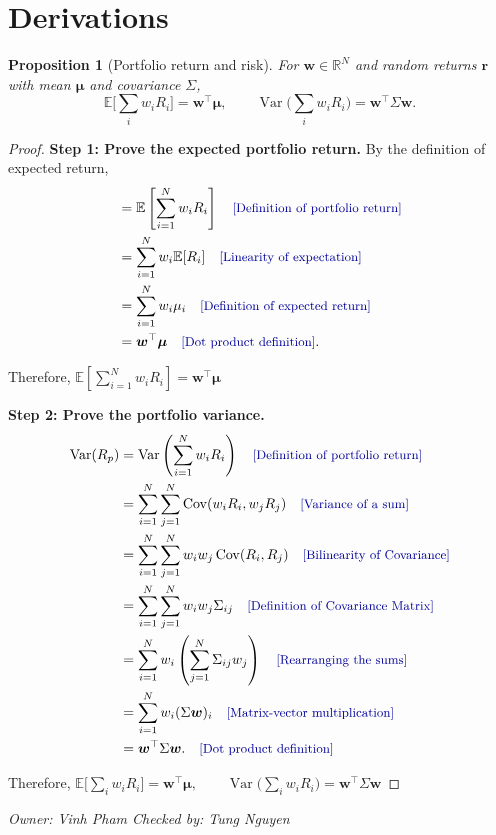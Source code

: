\documentclass[11pt]{article}
\theoremstyle{plain}
\newtheorem{proposition}[theorem]{Proposition}
\theoremstyle{definition}
\newcommand{\R}{\mathbb{R}}
\newcommand{\E}{\mathbb{E}}
\newcommand{\Var}{\operatorname{Var}}
\newcommand{\w}{\bm{w}}
\newcommand{\bmu}{\bm{\mu}}
\newcommand{\by}[1]{\quad\text{\small\color{blue!60!black}[#1]}}   %
\newcommand{\owner}[2]{\par\smallskip\noindent\textit{Owner: #1 \quad Checked by: #2}\par}
\begin{document}
\section{Derivations}

\begin{proposition}[Portfolio return and risk]\label{prop:q1}
For $\w\in\R^N$ and random returns $\bm r$ with mean $\bmu$ and covariance $\Sigma$,
\[
\E\Big[\textstyle\sum_i w_iR_i\Big] = \w^\top\bmu, \qquad
\Var\Big(\textstyle\sum_i w_iR_i\Big) = \w^\top\Sigma\w .
\]
\end{proposition}
\begin{proof}

\textbf{Step 1: Prove the expected portfolio return.}
By the definition of expected return,
\begin{align*}
&=\E\left[\sum_{i=1}^{N}w_iR_i\right]
\by{Definition of portfolio return}\\
&=\sum_{i=1}^{N}w_i\E[R_i]
\by{Linearity of expectation}\\
&=\sum_{i=1}^{N}w_i\mu_i
\by{Definition of expected return}\\
&=\w^\top\bmu
\by{Dot product definition}.
\end{align*}

Therefore, $\mathbb{E}\left[\sum_{i=1}^{N}w_iR_i\right] = \w^\top\bmu$

\textbf{Step 2: Prove the portfolio variance.}
\begin{align*}
\operatorname{Var}(R_p)
&=\operatorname{Var}\left(
\sum_{i=1}^{N}w_iR_i\right)
\by{Definition of portfolio return}\\
&=\sum_{i=1}^{N}\sum_{j=1}^{N}
\operatorname{Cov}(w_iR_i,w_jR_j)
\by{Variance of a sum}\\
&=\sum_{i=1}^{N}\sum_{j=1}^{N}w_iw_j\operatorname{Cov}(R_i,R_j)
\by{Bilinearity of Covariance}\\
&=\sum_{i=1}^{N}\sum_{j=1}^{N}w_iw_j\Sigma_{ij}
\by{Definition of Covariance Matrix}\\
&=\sum_{i=1}^{N}w_i
\left(\sum_{j=1}^{N}\Sigma_{ij}w_j\right)
\by{Rearranging the sums}\\
&=\sum_{i=1}^{N}w_i(\Sigma\w)_i
\by{Matrix-vector multiplication}\\
&=\w^\top\Sigma\w.
\by{Dot product definition}
\end{align*}


Therefore,
$\E[\textstyle\sum_i w_iR_i\Big]=\w^\top\bmu,
\qquad
\Var(\textstyle\sum_i w_iR_i\Big)=\w^\top\Sigma\w$
\end{proof}
\owner{Vinh Pham}{Tung Nguyen}
\end{document}
